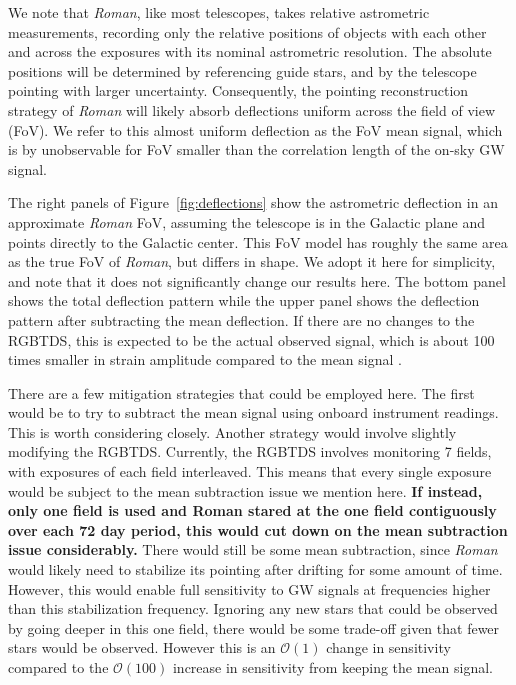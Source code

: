 \documentclass[12pt]{article}
\def\roman{\textit{Roman}\xspace}
\begin{document}
We note that \roman, like most telescopes, takes relative astrometric measurements, recording only the relative positions of objects with each other and across the exposures with its nominal astrometric resolution. The absolute positions will be determined by referencing guide stars, and by the telescope pointing with larger uncertainty. Consequently, the pointing reconstruction strategy of \roman will likely absorb deflections uniform across the field of view (FoV). We refer to this almost uniform deflection as the FoV mean signal, which is by unobservable for FoV smaller than the correlation length of the on-sky GW signal.

The right panels of Figure~\ref{fig:deflections} show the astrometric deflection in an approximate \roman FoV, assuming the telescope is in the Galactic plane and points directly to the Galactic center. This FoV model has roughly the same area as the true FoV of \roman, but differs in shape. We adopt it here for simplicity, and note that it does not significantly change our results here.
The bottom panel shows the total deflection pattern while the upper panel shows the deflection pattern after subtracting the mean deflection. If there are no changes to the RGBTDS, this is expected to be the actual observed signal, which is about 100 times smaller in strain amplitude compared to the mean signal \cite{Wang2021}.

There are a few mitigation strategies that could be employed here. The first would be to try to subtract the mean signal using onboard instrument readings. This is worth considering closely. Another strategy would involve slightly modifying the RGBTDS. Currently, the RGBTDS involves monitoring 7 fields, with exposures of each field interleaved. This means that every single exposure would be subject to the mean subtraction issue we mention here. \textbf{If instead, only one field is used and Roman stared at the one field contiguously over each 72 day period, this would cut down on the mean subtraction issue considerably.} There would still be some mean subtraction, since \roman would likely need to stabilize its pointing after drifting for some amount of time. However, this would enable full sensitivity to GW signals at frequencies higher than this stabilization frequency. Ignoring any new stars that could be observed by going deeper in this one field, there would be some trade-off given that fewer stars would be observed. However this is an $\mathcal{O}(1)$ change in sensitivity compared to the $\mathcal{O}(100)$ increase in sensitivity from keeping the mean signal.
\end{document}
